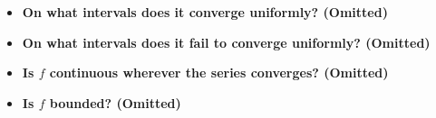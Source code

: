 \begin{Exercise}
	\begin{itemize}
		\item \textbf{On what intervals does it converge uniformly? (Omitted)}
	\end{itemize}
	
	\begin{itemize}
		\item \textbf{On what intervals does it fail to converge uniformly? (Omitted)}
	\end{itemize}
	
	\begin{itemize}
		\item \textbf{Is $f$ continuous wherever the series converges? (Omitted)}
	\end{itemize}
	
	\begin{itemize}
		\item \textbf{Is $f$ bounded? (Omitted)}
	\end{itemize}
\end{Exercise}